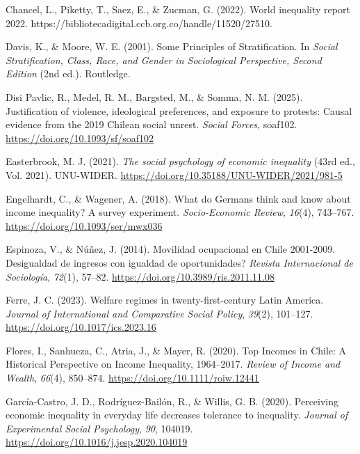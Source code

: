 \documentclass[
  12pt,
]{article}
\newlength{\cslhangindent}
\newenvironment{CSLReferences}[2] %
 {\begin{list}{}{%
  \setlength{\itemindent}{0pt}
  \setlength{\leftmargin}{0pt}
  \setlength{\parsep}{0pt}
  \ifodd #1
   \setlength{\leftmargin}{\cslhangindent}
   \setlength{\itemindent}{-1\cslhangindent}
  \fi
  \setlength{\itemsep}{#2\baselineskip}}}
 {\end{list}}
\begin{document}
\begin{CSLReferences}{1}{0}
Chancel, L., Piketty, T., Saez, E., \& Zucman, G. (2022). World
inequality report 2022.
https://bibliotecadigital.ccb.org.co/handle/11520/27510.

Davis, K., \& Moore, W. E. (2001). Some {Principles} of
{Stratification}. In \emph{Social {Stratification}, {Class}, {Race}, and
{Gender} in {Sociological Perspective}, {Second Edition}} (2nd ed.).
Routledge.

Disi Pavlic, R., Medel, R. M., Bargsted, M., \& Somma, N. M. (2025).
Justification of violence, ideological preferences, and exposure to
protests: Causal evidence from the 2019 {Chilean} social unrest.
\emph{Social Forces}, soaf102. \url{https://doi.org/10.1093/sf/soaf102}

Easterbrook, M. J. (2021). \emph{The social psychology of economic
inequality} (43rd ed., Vol. 2021). UNU-WIDER.
\url{https://doi.org/10.35188/UNU-WIDER/2021/981-5}

Engelhardt, C., \& Wagener, A. (2018). What do {Germans} think and know
about income inequality? {A} survey experiment. \emph{Socio-Economic
Review}, \emph{16}(4), 743--767.
\url{https://doi.org/10.1093/ser/mwx036}

Espinoza, V., \& Núñez, J. (2014). Movilidad ocupacional en {Chile}
2001-2009. {\textquestiondown}{Desigualdad} de ingresos con igualdad de
oportunidades? \emph{Revista Internacional de Sociolog{í}a},
\emph{72}(1), 57--82. \url{https://doi.org/10.3989/ris.2011.11.08}

Ferre, J. C. (2023). Welfare regimes in twenty-first-century {Latin
America}. \emph{Journal of International and Comparative Social Policy},
\emph{39}(2), 101--127. \url{https://doi.org/10.1017/ics.2023.16}

Flores, I., Sanhueza, C., Atria, J., \& Mayer, R. (2020). Top {Incomes}
in {Chile}: {A Historical Perspective} on {Income Inequality},
1964--2017. \emph{Review of Income and Wealth}, \emph{66}(4), 850--874.
\url{https://doi.org/10.1111/roiw.12441}

García-Castro, J. D., Rodríguez-Bailón, R., \& Willis, G. B. (2020).
Perceiving economic inequality in everyday life decreases tolerance to
inequality. \emph{Journal of Experimental Social Psychology}, \emph{90},
104019. \url{https://doi.org/10.1016/j.jesp.2020.104019}


\end{CSLReferences}
\end{document}

